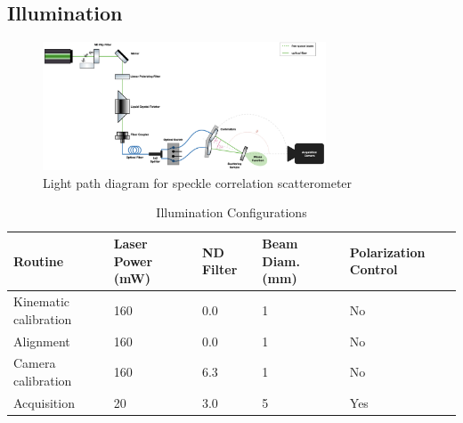 \subsection{Illumination}

\begin{figure}
    \centering
    \includegraphics[width=0.75\textwidth]{../figures/laser_path.png}
    \caption{Light path diagram for speckle correlation scatterometer}
    \label{fig:light_path}
\end{figure}

\begin{table}[htbp]
    \renewcommand{\arraystretch}{1.25}
    \caption{Illumination Configurations}
    \begin{center}
        \begin{tabular}{ l l l l l }
        \toprule[2pt]
         \textbf{Routine} & \textbf{Laser Power (mW)} & \textbf{ND Filter} & \textbf{Beam Diam. (mm)} & \textbf{Polarization Control}\\
         \midrule[0.75pt]
         Kinematic calibration & 160 & 0.0 & 1 & No \\
         Alignment & 160 & 0.0 & 1 & No \\
         Camera calibration & 160 & 6.3 & 1 & No \\
         Acquisition & 20 & 3.0 & 5 & Yes \\
         \bottomrule[2pt]
        \end{tabular}
        \label{tab:cpu-gpu}
    \end{center}
\end{table}

